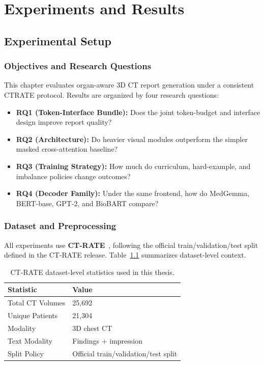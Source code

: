 \chapter{Experiments and Results}\label{chapter:experiments}

\section{Experimental Setup}\label{sec:exp_setup}
\subsection{Objectives and Research Questions}
This chapter evaluates organ-aware 3D CT report generation under a consistent \ac{CTRATE} protocol. Results are organized by four research questions:
\begin{itemize}
    \item \textbf{RQ1 (Token-Interface Bundle):} Does the joint token-budget and interface design improve report quality?
    \item \textbf{RQ2 (Architecture):} Do heavier visual modules outperform the simpler masked cross-attention baseline?
    \item \textbf{RQ3 (Training Strategy):} How much do curriculum, hard-example, and imbalance policies change outcomes?
    \item \textbf{RQ4 (Decoder Family):} Under the same frontend, how do MedGemma, BERT-base, GPT-2, and BioBART compare?
\end{itemize}

\subsection{Dataset and Preprocessing}
All experiments use \textbf{CT-RATE}~\cite{hamamci2024foundation}, following the official train/validation/test split defined in the CT-RATE release. Table~\ref{tab:ctrate_stats} summarizes dataset-level context.

\begin{table}[htbp]
    \centering
    \caption{CT-RATE dataset-level statistics used in this thesis.}
    \label{tab:ctrate_stats}
    \begin{tabular}{ll}
        \toprule
        \textbf{Statistic} & \textbf{Value} \\\midrule
        Total CT Volumes & 25,692 \\
        Unique Patients & 21,304 \\
        Modality & 3D chest CT \\
        Text Modality & Findings + impression \\
        Split Policy & Official train/validation/test split \\
        \bottomrule
    \end{tabular}
\end{table}

